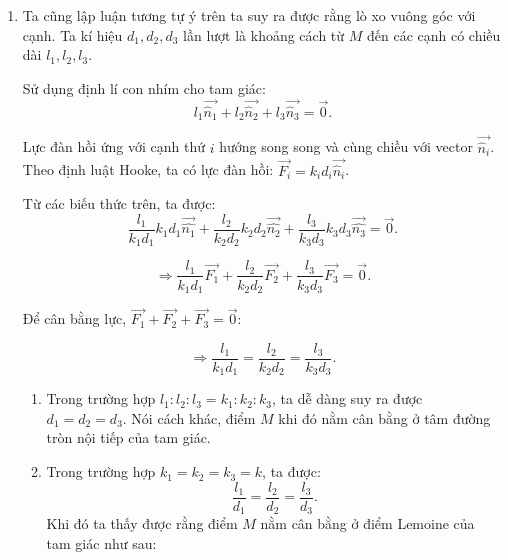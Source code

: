 \begin{enumerate}[label=(\alph*)]
\begin{figure}[H]
{}
\centering
\caption{}
\label{figs:S1_01}
\end{figure}
Ta vẽ các vị trí trên bằng cách từ một đỉnh ta hạ đường thẳng vuông góc với hai cạnh kề với đỉnh đó (do dây luôn vuông góc với cạnh và ta xác định vùng mà ròng rọc nằm trên cạnh đó bằng cách kẻ đường vuông góc với cạnh từ hai đầu mút của mỗi cạnh, khi đó không gian nằm giữa hai đường thẳng vừa kẻ là vùng mà ròng rọc vẫn nằm trên cạnh đó) ta dễ dàng tìm được khu vực mà vật $M$ sẽ cân bằng (Ngoài ra, ta có thể để ý rằng đối với $N$ lẻ thì khu vực đó có dạng $2N$ giác đều còn $N$ chẵn thì khu vực đó có dạng $N$ giác đều)
\item Ta cũng lập luận tương tự ý trên ta suy ra được rằng lò xo vuông góc với cạnh. Ta kí hiệu $d_1,d_2,d_3$ lần lượt là khoảng cách từ $M$ đến các cạnh có chiều dài $l_1,l_2,l_3$.

Sử dụng định lí con nhím cho tam giác:
\begin{equation}
l_1\vec{\hat{n}_1}+l_2\vec{\hat{n}_2}+l_3\vec{\hat{n}_3}=\vec{0}.
\end{equation}

Lực đàn hồi ứng với cạnh thứ $i$ hướng song song và cùng chiều với vector $\vec{\hat{n}_i}$. Theo định luật Hooke, ta có lực đàn hồi: $\vec{F_i}=k_id_i\vec{\hat{n}_i}$.

Từ các biếu thức trên, ta được:
\begin{equation}
\label{eq:S1_01}
\dfrac{l_1}{k_1d_1}k_1d_1\vec{\hat{n_1}}+\dfrac{l_2}{k_2d_2}k_2d_2\vec{\hat{n_2}}+\dfrac{l_3}{k_3d_3}k_3d_3\vec{\hat{n_3}}=\vec{0}.
\end{equation}

\begin{equation}
\Longrightarrow\dfrac{l_1}{k_1d_1}\vec{F_1}+\dfrac{l_2}{k_2d_2}\vec{F_2}+\dfrac{l_3}{k_3d_3}\vec{F_3}=\vec{0}.
\end{equation}

Để cân bằng lực, $\vec{F_1}+\vec{F_2}+\vec{F_3}=\vec{0}$:

\begin{equation}
\label{eq:S1_02}
\Longrightarrow \dfrac{l_1}{k_1d_1}=\dfrac{l_2}{k_2d_2}=\dfrac{l_3}{k_3d_3}.
\end{equation}
    \begin{enumerate}[label=(\roman*)]
    \item Trong trường hợp $l_1:l_2:l_3=k_1:k_2:k_3$, ta dễ dàng suy ra được $d_1=d_2=d_3$. Nói cách khác, điểm $M$ khi đó nằm cân bằng ở tâm đường tròn nội tiếp của tam giác.
    \item Trong trường hợp $k_1=k_2=k_3=k$, ta được: 
    \begin{equation}
    \label{eq:S1_03}
    \dfrac{l_1}{d_1}=\dfrac{l_2}{d_2}=\dfrac{l_3}{d_3}.
    \end{equation}
    Khi đó ta thấy được rằng điểm $M$ nằm cân bằng ở điểm Lemoine của tam giác như sau:


\end{enumerate}
\end{enumerate}
